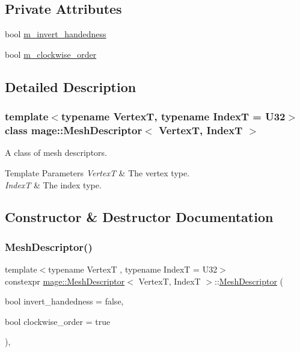 \subsection*{Private Attributes}
\begin{DoxyCompactItemize}
\item 
bool \hyperlink{classmage_1_1_mesh_descriptor_a95491d0719f524589192d74fe5622bf8}{m\+\_\+invert\+\_\+handedness}
\item 
bool \hyperlink{classmage_1_1_mesh_descriptor_aa64fd6421b27729a6b27ad0c2b70af1e}{m\+\_\+clockwise\+\_\+order}
\end{DoxyCompactItemize}


\subsection{Detailed Description}
\subsubsection*{template$<$typename VertexT, typename IndexT = U32$>$\newline
class mage\+::\+Mesh\+Descriptor$<$ Vertex\+T, Index\+T $>$}

A class of mesh descriptors.


\begin{DoxyTemplParams}{Template Parameters}
{\em VertexT} & The vertex type. \\
\hline
{\em IndexT} & The index type. \\
\hline
\end{DoxyTemplParams}


\subsection{Constructor \& Destructor Documentation}
\hypertarget{classmage_1_1_mesh_descriptor_aab7cab220ecd16b78209000664c74231}{}\label{classmage_1_1_mesh_descriptor_aab7cab220ecd16b78209000664c74231} 
\subsubsection{\texorpdfstring{Mesh\+Descriptor()}{MeshDescriptor()}\hspace{0.1cm}{\footnotesize\ttfamily [1/3]}}
{\footnotesize\ttfamily template$<$typename VertexT , typename IndexT  = U32$>$ \\
constexpr \hyperlink{classmage_1_1_mesh_descriptor}{mage\+::\+Mesh\+Descriptor}$<$ VertexT, IndexT $>$\+::\hyperlink{classmage_1_1_mesh_descriptor}{Mesh\+Descriptor} (\begin{DoxyParamCaption}\item[{bool}]{invert\+\_\+handedness = {\ttfamily false},  }\item[{bool}]{clockwise\+\_\+order = {\ttfamily true} }\end{DoxyParamCaption})\hspace{0.3cm}{\ttfamily [explicit]}, {\ttfamily [noexcept]}}

